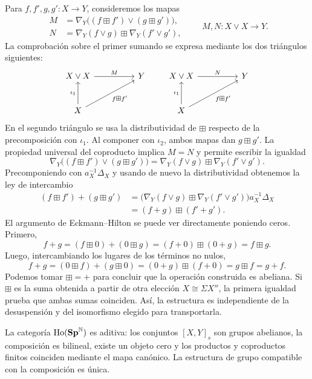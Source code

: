Para $f,f',g,g'\colon X\to Y$, consideremos los mapas
\[
\begin{aligned}
M&=\nabla_Y\bigl((f\boxplus f')\vee(g\boxplus g')\bigr),\\
N&=\nabla_Y(f\vee g)\boxplus\nabla_Y(f'\vee g'),
\end{aligned}
\qquad M,N\colon X\vee X\to Y.
\]
La comprobación sobre el primer sumando se expresa mediante los dos triángulos siguientes:
\[
\begin{tikzcd}[column sep=huge,row sep=large]
X\vee X\arrow[r,"M"]&Y\\
X\arrow[u,"\iota_1"]\arrow[ur,"f\boxplus f'"']&
\end{tikzcd}
\qquad
\begin{tikzcd}[column sep=huge,row sep=large]
X\vee X\arrow[r,"N"]&Y\\
X\arrow[u,"\iota_1"]\arrow[ur,"f\boxplus f'"']&
\end{tikzcd}
\]
En el segundo triángulo se usa la distributividad de $\boxplus$ respecto de la precomposición con $\iota_1$. Al componer con $\iota_2$, ambos mapas dan $g\boxplus g'$. La propiedad universal del coproducto implica $M=N$ y permite escribir la igualdad
\[
\nabla_Y\bigl((f\boxplus f')\vee(g\boxplus g')\bigr)
=\nabla_Y(f\vee g)\boxplus\nabla_Y(f'\vee g').
\]
Precomponiendo con $a_X^{-1}\Delta_X$ y usando de nuevo la distributividad obtenemos la ley de intercambio
\[
\begin{aligned}
(f\boxplus f')+(g\boxplus g')
&=\bigl(\nabla_Y(f\vee g)\boxplus\nabla_Y(f'\vee g')\bigr)a_X^{-1}\Delta_X\\
&=(f+g)\boxplus(f'+g').
\end{aligned}
\]
El argumento de Eckmann--Hilton se puede ver directamente poniendo ceros. Primero,
\[
f+g=(f\boxplus0)+(0\boxplus g)
=(f+0)\boxplus(0+g)=f\boxplus g.
\]
Luego, intercambiando los lugares de los términos no nulos,
\[
f+g=(0\boxplus f)+(g\boxplus0)
=(0+g)\boxplus(f+0)=g\boxplus f=g+f.
\]
Podemos tomar $\boxplus=+$ para concluir que la operación construida es abeliana. Si $\boxplus$ es la suma obtenida a partir de otra elección $X\cong\Sigma X''$, la primera igualdad prueba que ambas sumas coinciden. Así, la estructura es independiente de la desuspensión y del isomorfismo elegido para transportarla.

\begin{teo}\label{teo:c17-categoria-aditiva}
La categoría $\operatorname{Ho}(\mathbf{Sp}^{\mathbb N})$ es aditiva: los conjuntos $[X,Y]_s$ son grupos abelianos, la composición es bilineal, existe un objeto cero y los productos y coproductos finitos coinciden mediante el mapa canónico. La estructura de grupo compatible con la composición es única.
\end{teo}

